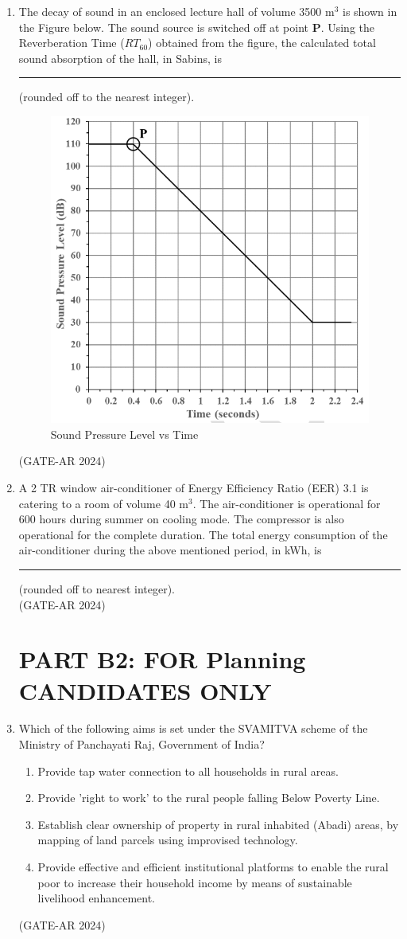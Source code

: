 \documentclass[a4paper,10pt]{article}
\begin{document}
\begin{enumerate}
\newpage

    \item The decay of sound in an enclosed lecture hall of volume 3500 m$^3$ is shown in the Figure below. The sound source is switched off at point \textbf{P}. Using the Reverberation Time ($RT_60$) obtained from the figure, the calculated total sound absorption of the hall, in Sabins, is \rule{2cm}{0.4pt} (rounded off to the nearest integer). \\
    \begin{figure}[h!]
    \centering
    \includegraphics[width=0.5\columnwidth]{figs/17.jpg}
    \caption{Sound Pressure Level vs Time}
    \label{fig:Img17}
    \end{figure}
    \hfill (GATE-AR 2024)

    \item A 2 TR window air-conditioner of Energy Efficiency Ratio (EER) 3.1 is catering to a room of volume 40 m$^3$. The air-conditioner is operational for 600 hours during summer on cooling mode. The compressor is also operational for the complete duration. The total energy consumption of the air-conditioner during the above mentioned period, in kWh, is \rule{2cm}{0.4pt} (rounded off to nearest integer). \\
    \hfill (GATE-AR 2024)

\section*{PART B2: FOR Planning CANDIDATES ONLY}

    \item Which of the following aims is set under the SVAMITVA scheme of the Ministry of Panchayati Raj, Government of India?
    \begin{enumerate}
        \item Provide tap water connection to all households in rural areas.
        \item Provide 'right to work' to the rural people falling Below Poverty Line.
        \item Establish clear ownership of property in rural inhabited (Abadi) areas, by mapping of land parcels using improvised technology.
        \item Provide effective and efficient institutional platforms to enable the rural poor to increase their household income by means of sustainable livelihood enhancement.
    \end{enumerate}
    \hfill (GATE-AR 2024)


\end{enumerate}
\end{document}
